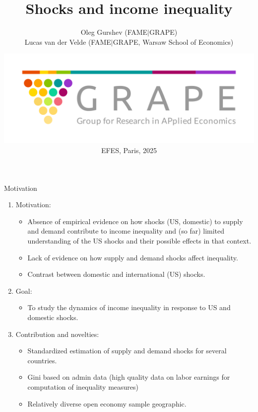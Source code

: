 \documentclass[10pt,leqno,aspectratio=169,presentation]{beamer} %
\begin{document}
\title{Shocks and income inequality}

\author{Oleg Gurshev {\tiny(FAME$\mid$GRAPE)}  \\
Lucas van der Velde {\tiny (FAME$\mid$GRAPE, Warsaw School of Economics)}}
\date{\vspace{6pt} \centering  \includegraphics[width=.33\textwidth]{Slides/logo_solo.png} \\ \footnotesize{EFES, Paris, 2025}}


\begin{frame}
    \titlepage
\end{frame}


\begin{frame}{Motivation}
\begin{enumerate}
    \item<1-> Motivation:
    \begin{itemize}
        \item<1-> Absence of empirical evidence on how shocks (US, domestic) to supply and demand contribute to income inequality and (so far) limited understanding of the US shocks and their possible effects in that context.
        \item<1-> Lack of evidence on how supply and demand shocks affect inequality.
        \item<1-> Contrast between domestic and international (US) shocks.
    \end{itemize}
    \item<2-> Goal:
    \begin{itemize}
        \item<2-> To study the dynamics of income inequality in response to US and domestic shocks.
    \end{itemize}
    \item<3-> Contribution and novelties:
    \begin{itemize}
        \item<3-> Standardized estimation of supply and demand shocks for several countries.
        \item<3-> Gini based on admin data (high quality data on labor earnings for computation of inequality measures)
        \item<3-> Relatively diverse open economy sample geographic.
    \end{itemize}
\end{enumerate}
\end{frame}
\end{document}
